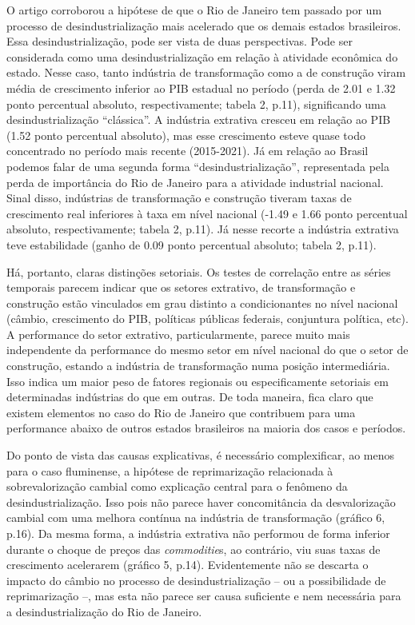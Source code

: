 O artigo corroborou a hipótese de que o Rio de Janeiro tem passado por
um processo de desindustrialização mais acelerado que os demais estados
brasileiros. Essa desindustrialização, pode ser vista de duas
perspectivas. Pode ser considerada como uma desindustrialização em
relação à atividade econômica do estado. Nesse caso, tanto indústria de
transformação como a de construção viram média de crescimento inferior
ao PIB estadual no período (perda de 2.01 e 1.32 ponto percentual
absoluto, respectivamente; tabela 2, p.11), significando uma
desindustrialização ``clássica''. A indústria extrativa cresceu em
relação ao PIB (1.52 ponto percentual absoluto), mas esse crescimento
esteve quase todo concentrado no período mais recente (2015-2021). Já em
relação ao Brasil podemos falar de uma segunda forma
``desindustrialização'', representada pela perda de importância do Rio
de Janeiro para a atividade industrial nacional. Sinal disso, indústrias
de transformação e construção tiveram taxas de crescimento real
inferiores à taxa em nível nacional (-1.49 e 1.66 ponto percentual
absoluto, respectivamente; tabela 2, p.11). Já nesse recorte a indústria
extrativa teve estabilidade (ganho de 0.09 ponto percentual absoluto;
tabela 2, p.11).

Há, portanto, claras distinções setoriais. Os testes de correlação entre
as séries temporais parecem indicar que os setores extrativo, de
transformação e construção estão vinculados em grau distinto a
condicionantes no nível nacional (câmbio, crescimento do PIB, políticas
públicas federais, conjuntura política, etc). A performance do setor
extrativo, particularmente, parece muito mais independente da
performance do mesmo setor em nível nacional do que o setor de
construção, estando a indústria de transformação numa posição
intermediária. Isso indica um maior peso de fatores regionais ou
especificamente setoriais em determinadas indústrias do que em outras.
De toda maneira, fica claro que existem elementos no caso do Rio de
Janeiro que contribuem para uma performance abaixo de outros estados
brasileiros na maioria dos casos e períodos.

Do ponto de vista das causas explicativas, é necessário complexificar,
ao menos para o caso fluminense, a hipótese de reprimarização
relacionada à sobrevalorização cambial como explicação central para o
fenômeno da desindustrialização. Isso pois não parece haver
concomitância da desvalorização cambial com uma melhora contínua na
indústria de transformação (gráfico 6, p.16). Da mesma forma, a
indústria extrativa não performou de forma inferior durante o choque de
preços das \emph{commoditie}s, ao contrário, viu suas taxas de
crescimento acelerarem (gráfico 5, p.14). Evidentemente não se descarta
o impacto do câmbio no processo de desindustrialização -- ou a
possibilidade de reprimarização --, mas esta não parece ser causa
suficiente e nem necessária para a desindustrialização do Rio de
Janeiro.

